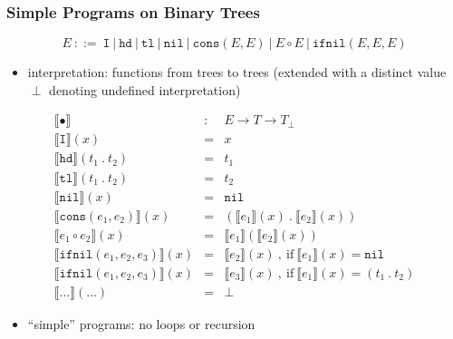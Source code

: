 \documentclass{beamer}
\begin{document}
\begin{frame}
  \frametitle{Simple Programs on Binary Trees}
  \[ E ~::=~ \texttt{I} ~|~ \texttt{hd} ~|~ \texttt{tl} ~|~ \texttt{nil}
       ~|~ \texttt{cons}(E, E)
       ~|~ E \circ E
       ~|~ \texttt{ifnil}(E, E, E)  \]
  \begin{itemize}
    \item interpretation: functions from trees to trees 
      (extended with a distinct value $\perp$ denoting undefined interpretation)
  \end{itemize}
  \[
    \begin{array}{lcl}
    \llbracket \bullet \rrbracket & : & E \rightarrow T \rightarrow T_{\perp} \\
    \llbracket \texttt{I} \rrbracket(x) & = & x \\
    \llbracket \texttt{hd} \rrbracket(t_1 ~.~ t_2) & = & t_1 \\
    \llbracket \texttt{tl} \rrbracket(t_1 ~.~ t_2) & = & t_2 \\
    \llbracket \texttt{nil} \rrbracket(x) & = & \texttt{nil} \\
    \llbracket \texttt{cons}(e_1, e_2) \rrbracket(x) & = & 
        (\llbracket e_1 \rrbracket(x) ~.~ \llbracket e_2 \rrbracket(x)) \\
    \llbracket e_1 \circ e_2 \rrbracket(x) & = & 
        \llbracket e_1 \rrbracket(\llbracket e_2 \rrbracket(x)) \\
    \llbracket \texttt{ifnil}(e_1, e_2, e_3) \rrbracket(x) & = & 
        \llbracket e_2 \rrbracket(x) ~,~ \text{if} ~ \llbracket e_1 \rrbracket(x) = \texttt{nil} \\
    \llbracket \texttt{ifnil}(e_1, e_2, e_3) \rrbracket(x) & = & 
        \llbracket e_3 \rrbracket(x) ~,~ \text{if} ~ \llbracket e_1 \rrbracket(x) = (t_1 ~.~ t_2) \\
    \llbracket \ldots \rrbracket(\ldots) & = & \perp
    \end{array}  
  \]
  \begin{itemize}
    \item ``simple'' programs: no loops or recursion
  \end{itemize}
\end{frame}
\end{document}
